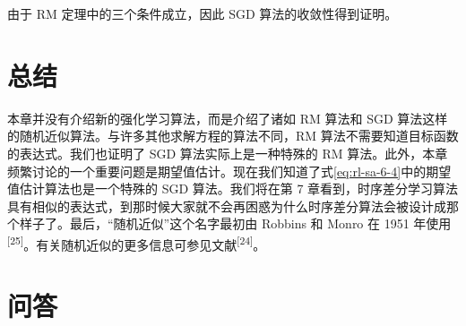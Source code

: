 \begin{insight}
由于 RM 定理中的三个条件成立，因此 SGD 算法的收敛性得到证明。
\end{insight}

\section{总结}
\label{sec:rl-sa-summary}

本章并没有介绍新的强化学习算法，而是介绍了诸如 RM 算法和 SGD 算法这样的随机近似算法。与许多其他求解方程的算法不同，RM 算法不需要知道目标函数的表达式。我们也证明了 SGD 算法实际上是一种特殊的 RM 算法。此外，本章频繁讨论的一个重要问题是期望值估计。现在我们知道了式\eqref{eq:rl-sa-6-4}中的期望值估计算法也是一个特殊的 SGD 算法。我们将在第 7 章看到，时序差分学习算法具有相似的表达式，到那时候大家就不会再困惑为什么时序差分算法会被设计成那个样子了。最后，“随机近似”这个名字最初由 Robbins 和 Monro 在 1951 年使用\textsuperscript{[25]}。有关随机近似的更多信息可参见文献\textsuperscript{[24]}。

\section{问答}
\label{sec:rl-sa-qa}

